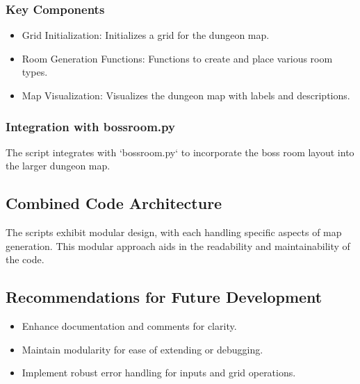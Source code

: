 \documentclass[10pt,twocolumn]{article}
\begin{document}
\subsubsection{Key Components}
\begin{itemize}
    \item Grid Initialization: Initializes a grid for the dungeon map.
    \item Room Generation Functions: Functions to create and place various room types.
    \item Map Visualization: Visualizes the dungeon map with labels and descriptions.
\end{itemize}

\subsubsection{Integration with bossroom.py}
The script integrates with `bossroom.py` to incorporate the boss room layout into the larger dungeon map.

\subsection{Combined Code Architecture}
The scripts exhibit modular design, with each handling specific aspects of map generation. This modular approach aids in the readability and maintainability of the code.

\subsection{Recommendations for Future Development}
\begin{itemize}
    \item Enhance documentation and comments for clarity.
    \item Maintain modularity for ease of extending or debugging.
    \item Implement robust error handling for inputs and grid operations.
\end{itemize}


\printbibliography
\end{document}
